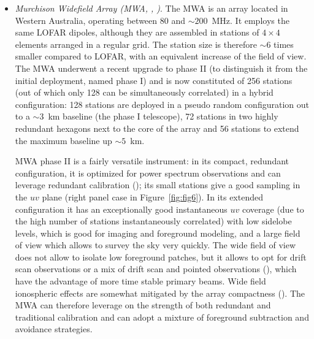 {\begin{itemize}
The calibration of LOFAR 21~cm observations relies on an accurate sky model where compact sources are modeled using the longest baselines available (i.e. $\sim 100$~km). Direction dependent calibration corrects ionospheric effects that corrupt visibilities on baselines longer than a few km, and the effect of variable primary beams on compact sources (\cite{yatawatta13}). The sky model is then subtracted from the visibilities and residual foregrounds are subtracted in the image domain (see details in Chapter~6 in this book). 

The LOFAR design is suited for 21~cm tomography on large angular scales, providing foregrounds are adequately subtracted (\cite{zaroubi12}).

\item {\it Murchison Widefield Array (MWA, \cite{tingay13}, \cite{wayth18})}. The MWA is an array located in Western Australia, operating between 80 and $\sim 200$~MHz. It employs the same LOFAR dipoles, although they are assembled in stations of $4 \times 4$ elements arranged in a regular grid. The station size is therefore $\sim 6$ times smaller compared to LOFAR, with an equivalent increase of the field of view. 
The MWA underwent a recent upgrade to phase II (to distinguish it from the initial deployment, named phase I) and is now constituted of 256 stations (out of which only 128 can be simultaneously correlated) in a hybrid configuration: 128 stations are deployed in a pseudo random configuration out to a $\sim 3$~km baseline (the phase I telescope), 72 stations in two highly redundant hexagons next to the core of the array and 56 stations to extend the maximum baseline up $\sim 5$~km. 

MWA phase II is a fairly versatile instrument: in its compact, redundant configuration, it is optimized for power spectrum observations and can leverage redundant calibration (\cite{li18}); its small stations give a good sampling in the $uv$ plane (right panel case in Figure~\ref{fig:fig6}). In its extended configuration it has an exceptionally good instantaneous $uv$ coverage (due to the high number of stations instantaneously correlated) with low sidelobe levels, which is good for imaging and foreground modeling, and a large field of view which allows to survey the sky very quickly. The wide field of view does not allow to isolate low foreground patches, but it allows to opt for drift scan observations or a mix of drift scan and pointed observations (\cite{trott14}), which have the advantage of more time stable primary beams. Wide field ionospheric effects are somewhat mitigated by the array compactness (\cite{jordan17}).
The MWA can therefore leverage on the strength of both redundant and traditional calibration and can adopt a mixture of foreground subtraction and avoidance strategies.


\end{itemize}}
